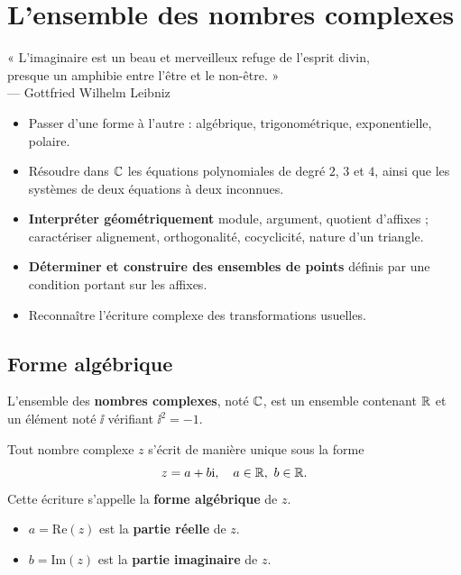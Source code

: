 \chapter{L'ensemble des nombres complexes}

\begin{citationchapitre}
	« L'imaginaire est un beau et merveilleux refuge de l'esprit divin,\\
	presque un amphibie entre l'être et le non-être. »\\[0.4em]
	— Gottfried Wilhelm Leibniz
\end{citationchapitre}

\begin{objectifs}
	\begin{itemize}[label=\textbullet]
		\item Passer d'une forme à l'autre : algébrique, trigonométrique,
		exponentielle, polaire.
		\item Résoudre dans $\mathbb{C}$ les équations polynomiales de degré $2$, $3$
		et $4$, ainsi que les systèmes de deux équations à deux inconnues.
		\item \textbf{Interpréter géométriquement} module, argument, quotient
		d'affixes ; caractériser alignement, orthogonalité, cocyclicité,
		nature d'un triangle.
		\item \textbf{Déterminer et construire des ensembles de points} définis
		par une condition portant sur les affixes.
		\item Reconnaître l'écriture complexe des transformations usuelles.
	\end{itemize}
\end{objectifs}


\section{Forme algébrique}

\begin{definition}
	L'ensemble des \textbf{nombres complexes}, noté $\mathbb{C}$, est un ensemble contenant $\mathbb{R}$
	et un élément noté $\ii$ vérifiant $\ii^2 = -1$.

	Tout nombre complexe $z$ s'écrit de manière unique sous la forme
	$$
	z = a + b\mathrm{i}, \quad a \in \mathbb{R},\ b \in \mathbb{R}.
	$$
	Cette écriture s'appelle la \textbf{forme algébrique} de $z$.
	\begin{itemize}[label=\textbullet]
		\item $a = \mathrm{Re}(z)$ est la \textbf{partie réelle} de $z$.
		\item $b = \mathrm{Im}(z)$ est la \textbf{partie imaginaire} de $z$.
	\end{itemize}
\end{definition}

